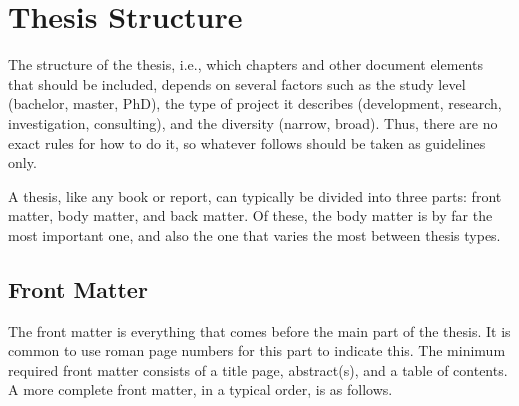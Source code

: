 \chapter{Thesis Structure}

The structure of the thesis, i.e., which chapters and other document elements that should be included, depends on several factors such as the study level (bachelor, master, PhD), the type of project it describes (development, research, investigation, consulting), and the diversity (narrow, broad). Thus, there are no exact rules for how to do it, so whatever follows should be taken as guidelines only.

A thesis, like any book or report, can typically be divided into three parts: front matter, body matter, and back matter. Of these, the body matter is by far the most important one, and also the one that varies the most between thesis types.

\section{Front Matter}
\label{sec:frontmatter}

The front matter is everything that comes before the main part of the thesis. It is common to use roman page numbers for this part to indicate this. The minimum required front matter consists of a title page, abstract(s), and a table of contents. A more complete front matter, in a typical order, is as follows.

